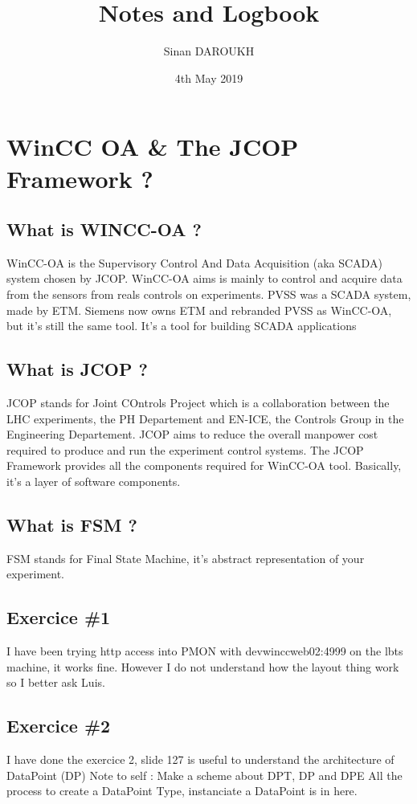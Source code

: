\documentclass[a4paper, 10pt]{article}
\title{Notes and Logbook}
\author{Sinan DAROUKH}
\date{4th May 2019}
\begin{document}
\begin{titlepage}
\maketitle
\end{titlepage}

\tableofcontents
\newpage

\section{WinCC OA \&  The JCOP Framework ?}
\subsection{What is WINCC-OA ?}
WinCC-OA is the Supervisory Control And Data Acquisition (aka SCADA) system chosen by JCOP.
WinCC-OA aims is mainly to control and acquire data from the sensors from reals controls on experiments.
PVSS was a SCADA system, made by ETM. Siemens now owns ETM and rebranded PVSS as WinCC-OA, but it's still the same tool.
It's a tool for building SCADA applications

\subsection{What is JCOP ?}
JCOP stands for Joint COntrols Project which is a collaboration between the LHC experiments, the PH Departement and EN-ICE, the Controls Group in the Engineering Departement. JCOP aims to reduce the overall manpower cost required to produce and run the experiment control systems.
The JCOP Framework provides all the components required for WinCC-OA tool. Basically, it's a layer of software components.

\subsection{What is FSM ?}
FSM stands for Final State Machine, it's abstract representation of your experiment.


\subsection{Exercice \#1}
I have been trying http access into PMON with devwinccweb02:4999 on the lbts machine, it works fine.
However I do not understand how the layout thing work so I better ask Luis.

\subsection{Exercice \#2}
I have done the exercice 2, slide 127 is useful to understand the architecture of DataPoint (DP)
Note to self : Make a scheme about DPT, DP and DPE
All the process to create a DataPoint Type, instanciate a DataPoint is in here.
\end{document}
